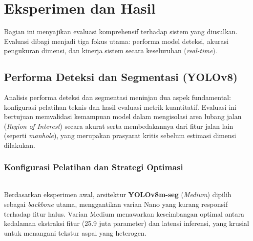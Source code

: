 \documentclass{iopjournal}
\begin{document}
\section{Eksperimen dan Hasil}
\label{sec:results}

Bagian ini menyajikan evaluasi komprehensif terhadap sistem yang diusulkan. Evaluasi dibagi menjadi tiga fokus utama: performa model deteksi, akurasi pengukuran dimensi, dan kinerja sistem secara keseluruhan (\textit{real-time}).


\subsection{Performa Deteksi dan Segmentasi (YOLOv8)}
\label{sec:yolo_performance}

Analisis performa deteksi dan segmentasi meninjau dua aspek fundamental: konfigurasi pelatihan teknis dan hasil evaluasi metrik kuantitatif. Evaluasi ini bertujuan memvalidasi kemampuan model dalam mengisolasi area lubang jalan (\textit{Region of Interest}) secara akurat serta membedakannya dari fitur jalan lain (seperti \textit{manhole}), yang merupakan prasyarat kritis sebelum estimasi dimensi dilakukan.

\subsubsection{Konfigurasi Pelatihan dan Strategi Optimasi}
\mbox{}\\
Berdasarkan eksperimen awal, arsitektur \textbf{YOLOv8m-seg} (\textit{Medium}) dipilih sebagai \textit{backbone} utama, menggantikan varian Nano yang kurang responsif terhadap fitur halus. Varian Medium menawarkan keseimbangan optimal antara kedalaman ekstraksi fitur (25.9 juta parameter) dan latensi inferensi, yang krusial untuk menangani tekstur aspal yang heterogen.
\end{document}
